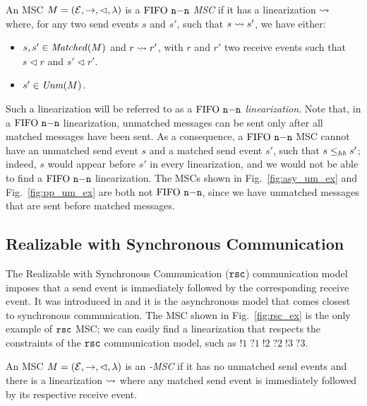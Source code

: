 \begin{definition}[$\nn$ MSC]\label{def:n_n}
	An MSC $M = (\mathcal{E},\to,\lhd,\lambda)$ is a \emph{$\nn$ MSC} if it has a linearization $\rightsquigarrow$ where, for any two send events $s$ and $s'$, such that $s \rightsquigarrow s'$, we have either:
	\begin{itemize}%
		\item $s,s' \in \mathit{Matched}(M)$ and $r \rightsquigarrow r'$, with $r$ and $r'$  two receive events such that $s \lhd r$ and $s' \lhd r'$.
		\item $s' \in \mathit{Unm}(M)$.
	\end{itemize}
\end{definition}

Such a linearization will be referred to as a \emph{$\nn$ linearization}. Note that, in a $\nn$ linearization, unmatched messages can be sent only after all matched messages have been sent.
As a consequence, a $\nn$ MSC cannot have an unmatched send event $s$ and a matched send event $s'$, such that $s \leq_{hb} s'$; indeed, $s$ would appear before $s'$ in every linearization, and we would not be able to find a $\nn$ linearization. The MSCs shown in Fig.~\ref{fig:asy_um_ex} and Fig.~\ref{fig:pp_um_ex} are both not $\nn$, since we have unmatched messages that are sent before matched messages.


\subsection{Realizable with Synchronous Communication}
The Realizable with Synchronous Communication ($\mathtt{rsc}$) communication model imposes that a send event is  immediately followed by the corresponding receive event. It was introduced in \cite{DBLP:journals/dc/Charron-BostMT96} and it is the asynchronous model that comes closest to synchronous communication. %
The MSC shown in Fig.~\ref{fig:rsc_ex} is the only example of $\mathtt{rsc}$ MSC; we can easily find a linearization that respects the constraints of the $\mathtt{rsc}$ communication model, such as $!1\;?1\;!2\;?2\;!3\;?3$. 

\begin{definition}\label{def:rsc}
	An MSC $M = (\mathcal{E},\to,\lhd,\lambda)$ is an \emph{\rsc-MSC} if it has no unmatched send events and there is a linearization $\rightsquigarrow$ where any matched send event is immediately followed by its respective receive event.
\end{definition}

